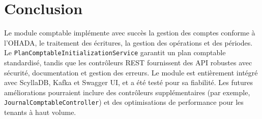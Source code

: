 \documentclass[a4paper,12pt]{article}
\begin{document}
\section{Conclusion}
Le module comptable implémente avec succès la gestion des comptes conforme à l'OHADA, le traitement des écritures, la gestion des opérations et des périodes. Le \texttt{PlanComptableInitializationService} garantit un plan comptable standardisé, tandis que les contrôleurs REST fournissent des API robustes avec sécurité, documentation et gestion des erreurs. Le module est entièrement intégré avec ScyllaDB, Kafka et Swagger UI, et a été testé pour sa fiabilité. Les futures améliorations pourraient inclure des contrôleurs supplémentaires (par exemple, \texttt{JournalComptableController}) et des optimisations de performance pour les tenants à haut volume.
\end{document}
